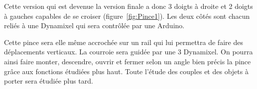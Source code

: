 \noindent Cette version qui est devenue la version finale a donc 3 doigts à droite et 2 doigts à gauches capables de se croiser (figure~\ref{fig:Pince1}). Les deux côtés sont chacun reliés à une Dynamixel qui sera contrôlée par une Arduino.

\noindent Cette pince sera elle même accrochée sur un rail qui lui permettra de faire des déplacements verticaux. La courroie sera guidée par une 3 Dynamixel. On pourra ainsi faire monter, descendre, ouvrir et fermer selon un angle bien précis la pince grâce aux fonctions étudiées plus haut. 
Toute l'étude des couples et des objets à porter sera étudiée plus tard.